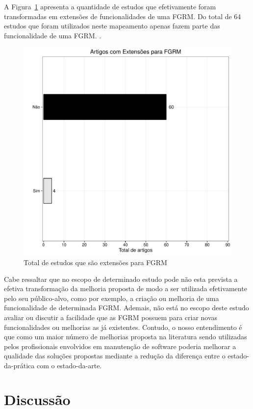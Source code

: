 A Figura~\ref{fig:grafico_virou_extensao} apresenta a quantidade de estudos que
efetivamente foram transformadas em extensões de funcionalidades de uma FGRM.
Do total de 64 estudos que foram utilizados neste mapeamento apenas fazem parte
das funcionalidade de uma FGRM. 
. 

\begin{figure}[htpb]
	\centering
	\includegraphics[width=0.8\linewidth]{chapter-mapeamento-sistematico/img/grafico_virou_extensao.pdf}
	\caption{Total de estudos que são extensões para FGRM}
	\label{fig:grafico_virou_extensao}
\end{figure}

Cabe ressaltar que no escopo de determinado estudo pode não esta prevista a
efetiva transformação da melhoria proposta de modo a ser utilizada efetivamente
pelo seu público-alvo, como por exemplo, a criação ou melhoria de uma
funcionalidade de determinada FGRM. Ademais, não está no escopo deste estudo
avaliar ou discutir a facilidade que as FGRM possuem para criar novas
funcionalidades ou melhorias as já existentes. Contudo, o nosso entendimento é
que como um maior número de melhorias proposta na literatura sendo utilizadas
pelos profissionais envolvidos em manutenção de software poderia melhorar a
qualidade das soluções propostas mediante a redução da diferença entre o
estado-da-prática com o estado-da-arte. 

\section{Discussão}
\label{sec:discussao}


